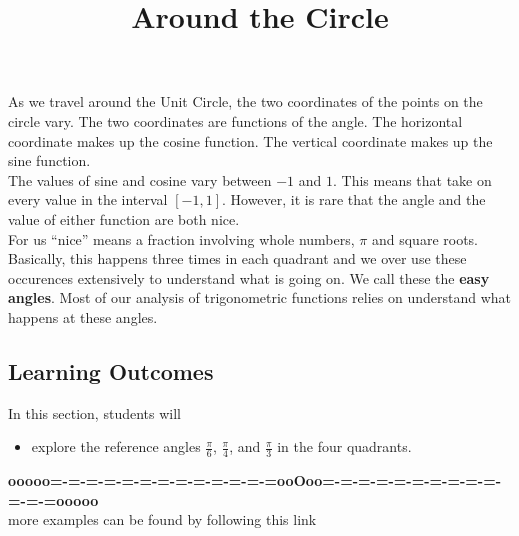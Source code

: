 \documentclass{ximera}
\title{Around the Circle}
\begin{document}
\begin{abstract}
\end{abstract}
\maketitle



As we travel around the Unit Circle, the two coordinates of the points on the circle vary.  The two coordinates are functions of the angle.   The horizontal coordinate makes up the cosine function. The vertical coordinate makes up the sine function.  \\


The values of sine and cosine vary between $-1$ and $1$.  This means that take on every value in the interval $[-1, 1]$.  However, it is rare that the angle and the value of either function are both nice. \\


For us ``nice'' means a fraction involving whole numbers, $\pi$ and square roots. \\


Basically, this happens three times in each quadrant and we over use these occurences extensively to understand what is going on.  We call these the \textbf{easy angles}.  Most of our analysis of trigonometric functions relies on understand what happens at these angles.
















\subsection{Learning Outcomes}

\begin{sectionOutcomes}
In this section, students will 

\begin{itemize}
\item explore the reference angles $\frac{\pi}{6}$, $\frac{\pi}{4}$, and $\frac{\pi}{3}$ in the four quadrants.
\end{itemize}
\end{sectionOutcomes}











\begin{center}
\textbf{\textcolor{green!50!black}{ooooo=-=-=-=-=-=-=-=-=-=-=-=-=ooOoo=-=-=-=-=-=-=-=-=-=-=-=-=ooooo}} \\

more examples can be found by following this link\\ 

\end{center}
\end{document}
